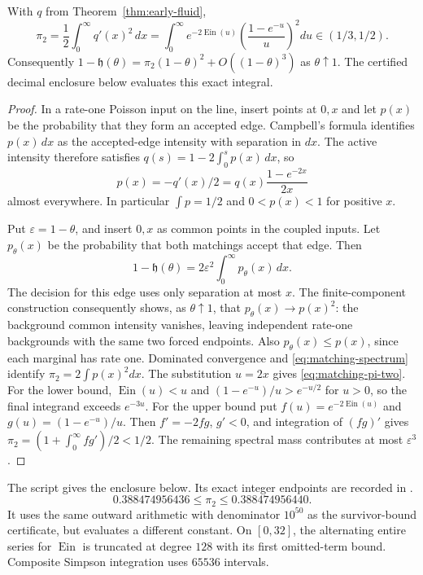 \documentclass[11pt,letterpaper]{article}
\begin{document}
\begin{proposition}
\label{prop:matching-quadratic-endpoint}
With $q$ from Theorem~\ref{thm:early-fluid},
\begin{equation}\label{eq:matching-pi-two}
 \pi_2=\frac12\int_0^\infty q'(x)^2\,dx
      =\int_0^\infty e^{-2\operatorname{Ein}(u)}
                       \left(\frac{1-e^{-u}}u\right)^2du
                       \in(1/3,1/2).
\end{equation}
Consequently $1-\mathfrak h(\theta)
 =\pi_2(1-\theta)^2+O((1-\theta)^3)$ as $\theta\uparrow1$.
The certified decimal enclosure below evaluates this exact integral.
\end{proposition}
\begin{proof}
In a rate-one Poisson input on the line, insert points at $0,x$ and
let $p(x)$ be the probability that they form an accepted edge.
Campbell's formula identifies $p(x)\,dx$ as the accepted-edge
intensity with separation in $dx$. The active intensity therefore
satisfies $q(s)=1-2\int_0^s p(x)\,dx$, so
\[
 p(x)=-q'(x)/2
     =q(x)\frac{1-e^{-2x}}{2x}
\]
almost everywhere. In particular $\int p=1/2$ and $0<p(x)<1$
for positive $x$.

Put $\varepsilon=1-\theta$, and insert $0,x$ as common points in
the coupled inputs. Let $p_\theta(x)$ be the probability that both
matchings accept that edge. Then
\[
 1-\mathfrak h(\theta)
       =2\varepsilon^2\int_0^\infty p_\theta(x)\,dx.
\]
The decision for this edge uses only separation at most $x$.
The finite-component construction consequently shows, as
$\theta\uparrow1$, that $p_\theta(x)\to p(x)^2$: the background
common intensity vanishes, leaving independent rate-one backgrounds
with the same two forced endpoints. Also $p_\theta(x)\le p(x)$,
since each marginal has rate one. Dominated convergence and
\eqref{eq:matching-spectrum} identify $\pi_2=2\int p(x)^2dx$.
The substitution $u=2x$ gives \eqref{eq:matching-pi-two}.
For the lower bound, $\operatorname{Ein}(u)<u$ and
$(1-e^{-u})/u>e^{-u/2}$ for $u>0$, so the final integrand exceeds
$e^{-3u}$. For the upper bound put
$f(u)=e^{-2\operatorname{Ein}(u)}$ and $g(u)=(1-e^{-u})/u$.
Then $f'=-2fg$, $g'<0$, and integration of $(fg)'$ gives
$\pi_2=(1+\int_0^\infty f g')/2<1/2$.
The remaining spectral mass contributes at most $\varepsilon^3$.
\end{proof}

The script  gives the enclosure
below. Its exact integer endpoints are recorded in
.
\begin{equation}\label{eq:matching-pi-two-certificate}
 0.388474956436\le\pi_2\le0.388474956440.
\end{equation}
It uses the same outward arithmetic with denominator $10^{50}$ as
the survivor-bound certificate, but evaluates a different constant.
On $[0,32]$, the alternating entire series for $\operatorname{Ein}$
is truncated at degree $128$ with its first omitted-term bound.
Composite Simpson integration uses $65536$ intervals.
\end{document}
